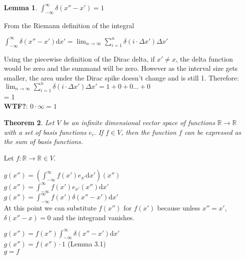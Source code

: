 \documentclass[11pt]{article} %
\newtheorem{theorem}{Theorem}[section]
\newtheorem{lemma}[theorem]{Lemma}
\newenvironment{proof}[1][Proof]{\begin{trivlist}
\item[\hskip \labelsep {\bfseries #1}]}{\end{trivlist}}
\begin{document}
\begin{lemma} 
	$\int_{-\infty}^{\infty}\delta(x'' - x') = 1$
\end{lemma}


\begin{proof}
	From the Riemann definition of the integral 
	
	{\center
		$\int_{-\infty}^{\infty}\delta(x'' - x') \mathrm{d}x' = \lim_{n \to \infty}\sum_{i = 1}^{n}\delta(i \cdot \Delta{x'})\Delta{x'}$ 
	}
	
	Using the piecewise definition of the Dirac delta, if $x' \neq x$, the delta function would be zero and the summand will be zero. However as the interval size gets smaller, the area under the Dirac spike doesn't change and is still 1. Therefore:
	{\center 
		$\lim_{n \to \infty}\sum_{i = 1}^{n}\delta(i \cdot \Delta{x'})\Delta{x'} = 1 + 0 + 0 \ldots + 0$ \\
		= 1 \\
	}
	\textbf{WTF?}: $ 0 \cdot \infty = 1 $ 
\end{proof}

\begin{theorem}
	Let $V$ be an infinite dimensional vector space of functions $\mathbb{R} \to \mathbb{R}$ with a set of basis functions ${e}_i$. If $f \in V$, then the function $f$ can be expressed as the sum of basis functions.
\end{theorem}

\begin{proof}
	Let $f \colon \mathbb{R} \to \mathbb{R} \in V$. 
	
	{\center 
		$g(x'') = (\int_{-\infty}^{\infty}f(x')e_{x'} \mathrm{d}x')(x'') $ \\
		$g(x'') = \int_{-\infty}^{\infty} f(x')e_{x'}(x'') \mathrm{d}x'$ \\
		$g(x'') = \int_{-\infty}^{\infty}f(x')\delta(x'' - x') \mathrm{d}x'$ \\
		
	}
	At this point we can substitute $f(x'')$ for $f(x')$ because unless $x'' = x'$, $\delta(x'' - x) = 0$ and the integrand vanishes. 
	
	{\center
		$g(x'') = f(x'') \int_{-\infty}^{\infty}\delta(x'' - x') \mathrm{d}x' $ \\
		$g(x'') = f(x'') \cdot 1$ (Lemma 3.1) \\
		$g = f$ \\
	}
\end{proof}
\end{document}
